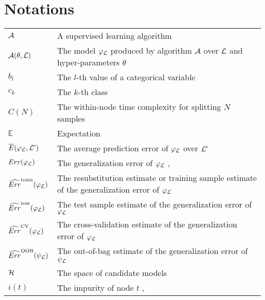 
\chapter{Notations}

\begin{tabularx}{\textwidth}{ l X }
${\cal A}$ & A supervised learning algorithm \dotfill  \pageref{ntn:A}\\
${\cal A}(\theta, {\cal L})$ & The model $\varphi_{\cal L}$ produced by algorithm ${\cal A}$ over ${\cal L}$ and hyper-parameters $\theta$ \dotfill  \pageref{ntn:A-func}\\
$b_l$ & The $l$-th value of a categorical variable \dotfill  \pageref{ntn:b_l}\\
$c_k$ & The $k$-th class \dotfill  \pageref{ntn:c_k}\\
$C(N)$ & The within-node time complexity for splitting $N$ samples \dotfill  \pageref{ntn:cN}\\
$\mathbb{E}$ & Expectation \dotfill \\
$\overline{E}(\varphi_{\cal L}, {\cal L}^\prime)$ & The average prediction error of $\varphi_{\cal L}$ over ${\cal L}^\prime$ \dotfill  \pageref{ntn:E_bar}\\
$Err(\varphi_{\cal L})$ & The generalization error of $\varphi_{\cal L}$ \dotfill  \pageref{eqn:generalization-error}, \pageref{eqn:4:generalization-error}\\
$\widehat{Err}^\text{train}(\varphi_{\cal L})$ & The resubstitution estimate or training sample estimate of the generalization error of $\varphi_{\cal L}$ \dotfill  \pageref{eqn:training-error}\\
$\widehat{Err}^\text{test}(\varphi_{\cal L})$ & The test sample estimate of the generalization error of $\varphi_{\cal L}$ \dotfill  \pageref{eqn:test-error}\\
$\widehat{Err}^\text{CV}(\varphi_{\cal L})$ & The cross-validation  estimate of the generalization error of $\varphi_{\cal L}$ \dotfill  \pageref{eqn:cv-error}\\
$\widehat{Err}^\text{OOB}(\psi_{\cal L})$ & The out-of-bag estimate of the generalization error of $\psi_{\cal L}$ \dotfill  \pageref{eqn:oob-error}\\
${\cal H}$ & The space of candidate models \dotfill  \pageref{ntn:H}\\
$i(t)$ & The impurity of node $t$ \dotfill  \pageref{ntn:i_t}, \pageref{ntn:i_t2}\\

\end{tabularx}

